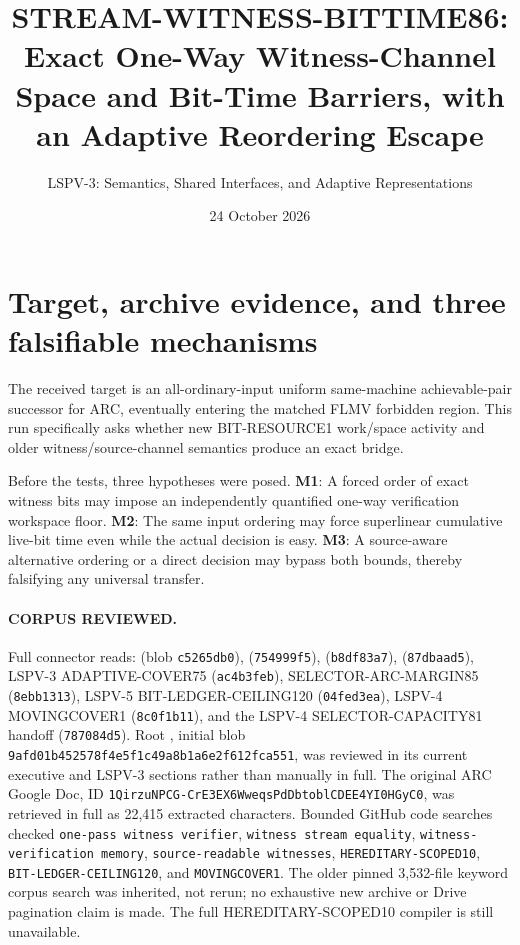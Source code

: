 \documentclass[11pt]{article}
\title{STREAM-WITNESS-BITTIME86: Exact One-Way Witness-Channel Space and Bit-Time Barriers, with an Adaptive Reordering Escape}
\author{LSPV-3: Semantics, Shared Interfaces, and Adaptive Representations}
\date{24 October 2026}
\begin{document}
\maketitle
\begin{center}
\end{center}
\section{Target, archive evidence, and three falsifiable mechanisms}
The received target is an all-ordinary-input uniform same-machine achievable-pair successor for ARC, eventually entering the matched FLMV forbidden region. This run specifically asks whether new BIT-RESOURCE1 work/space activity and older witness/source-channel semantics produce an exact bridge.

Before the tests, three hypotheses were posed. \textbf{M1}: A forced order of exact witness bits may impose an independently quantified one-way verification workspace floor. \textbf{M2}: The same input ordering may force superlinear cumulative live-bit time even while the actual decision is easy. \textbf{M3}: A source-aware alternative ordering or a direct decision may bypass both bounds, thereby falsifying any universal transfer.

\paragraph{CORPUS REVIEWED.}
Full connector reads:  (blob \texttt{c5265db0}),  (\texttt{754999f5}),  (\texttt{b8df83a7}),  (\texttt{87dbaad5}), LSPV-3 ADAPTIVE-COVER75 (\texttt{ac4b3feb}), SELECTOR-ARC-MARGIN85 (\texttt{8ebb1313}), LSPV-5 BIT-LEDGER-CEILING120 (\texttt{04fed3ea}), LSPV-4 MOVINGCOVER1 (\texttt{8c0f1b11}), and the LSPV-4 SELECTOR-CAPACITY81 handoff (\texttt{787084d5}). Root , initial blob \texttt{9afd01b452578f4e5f1c49a8b1a6e2f612fca551}, was reviewed in its current executive and LSPV-3 sections rather than manually in full. The original ARC Google Doc, ID \texttt{1QirzuNPCG-CrE3EX6WweqsPdDbtoblCDEE4YI0HGyC0}, was retrieved in full as 22,415 extracted characters. Bounded GitHub code searches checked \texttt{one-pass witness verifier}, \texttt{witness stream equality}, \texttt{witness-verification memory}, \texttt{source-readable witnesses}, \texttt{HEREDITARY-SCOPED10}, \texttt{BIT-LEDGER-CEILING120}, and \texttt{MOVINGCOVER1}. The older pinned 3,532-file keyword corpus search was inherited, not rerun; no exhaustive new archive or Drive pagination claim is made. The full HEREDITARY-SCOPED10 compiler is still unavailable.
\end{document}
